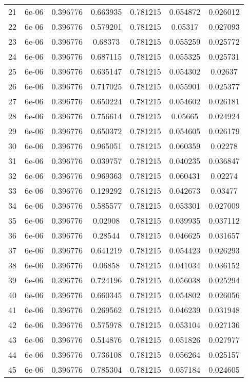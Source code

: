 \begin{table}
\begin{tabular*}{\linewidth}{c|c|c|c|c|c|c}
21 & 6e-06 & 0.396776 & 0.663935 & 0.781215 & 0.054872 & 0.026012\\
22 & 6e-06 & 0.396776 & 0.579201 & 0.781215 & 0.05317 & 0.027093\\
23 & 6e-06 & 0.396776 & 0.68373 & 0.781215 & 0.055259 & 0.025772\\
24 & 6e-06 & 0.396776 & 0.687115 & 0.781215 & 0.055325 & 0.025731\\
25 & 6e-06 & 0.396776 & 0.635147 & 0.781215 & 0.054302 & 0.02637\\
26 & 6e-06 & 0.396776 & 0.717025 & 0.781215 & 0.055901 & 0.025377\\
27 & 6e-06 & 0.396776 & 0.650224 & 0.781215 & 0.054602 & 0.026181\\
28 & 6e-06 & 0.396776 & 0.756614 & 0.781215 & 0.05665 & 0.024924\\
29 & 6e-06 & 0.396776 & 0.650372 & 0.781215 & 0.054605 & 0.026179\\
30 & 6e-06 & 0.396776 & 0.965051 & 0.781215 & 0.060359 & 0.02278\\
31 & 6e-06 & 0.396776 & 0.039757 & 0.781215 & 0.040235 & 0.036847\\
32 & 6e-06 & 0.396776 & 0.969363 & 0.781215 & 0.060431 & 0.02274\\
33 & 6e-06 & 0.396776 & 0.129292 & 0.781215 & 0.042673 & 0.03477\\
34 & 6e-06 & 0.396776 & 0.585577 & 0.781215 & 0.053301 & 0.027009\\
35 & 6e-06 & 0.396776 & 0.02908 & 0.781215 & 0.039935 & 0.037112\\
36 & 6e-06 & 0.396776 & 0.28544 & 0.781215 & 0.046625 & 0.031657\\
37 & 6e-06 & 0.396776 & 0.641219 & 0.781215 & 0.054423 & 0.026293\\
38 & 6e-06 & 0.396776 & 0.06858 & 0.781215 & 0.041034 & 0.036152\\
39 & 6e-06 & 0.396776 & 0.724196 & 0.781215 & 0.056038 & 0.025294\\
40 & 6e-06 & 0.396776 & 0.660345 & 0.781215 & 0.054802 & 0.026056\\
41 & 6e-06 & 0.396776 & 0.269562 & 0.781215 & 0.046239 & 0.031948\\
42 & 6e-06 & 0.396776 & 0.575978 & 0.781215 & 0.053104 & 0.027136\\
43 & 6e-06 & 0.396776 & 0.514876 & 0.781215 & 0.051826 & 0.027977\\
44 & 6e-06 & 0.396776 & 0.736108 & 0.781215 & 0.056264 & 0.025157\\
45 & 6e-06 & 0.396776 & 0.785304 & 0.781215 & 0.057184 & 0.024605\\
\end{tabular*}
\end{table}
